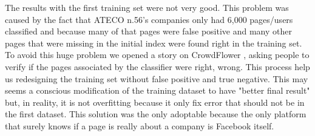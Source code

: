 The results with the first training set were not very good. This problem was caused by the fact that ATECO n.56's companies only had 6,000 pages/users classified and because many of that pages were false positive and many other pages that were missing in the initial index were found right in the training set.
To avoid this huge problem we opened a story on CrowdFlower
, asking people to verify if the pages associated by the classifier were right, wrong. This process help us redesigning the training set without false positive and true negative. This may seems a conscious modification of the training dataset to have "better final result" but, in reality, it is not overfitting because it only fix error that should not be in the first dataset. This solution was the only adoptable because the only platform that surely knows if a page is really about a company is Facebook itself.

